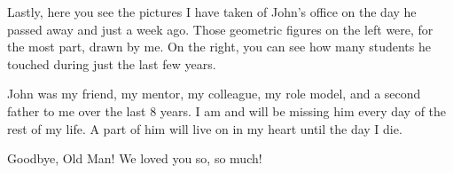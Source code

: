 \documentclass[journal,twoside,web]{ieeecolor}
\begin{document}
Lastly, here you see the pictures I have taken of John's office on the day 
he passed away and just a week ago. Those geometric figures on the left were, 
for the most part, drawn by me. On the right, you can see how many students 
he touched during just the last few years.

John was my friend, my mentor, my colleague, my role model, and a second father 
to me over the last 8 years. I am and will be missing him every day of the 
rest of my life. A part of him will live on in my heart until the day I die.

Goodbye, Old Man! We loved you so, so much!

% 

% 
\end{document}
